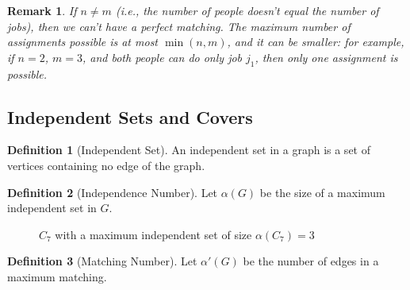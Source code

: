 \documentclass{article}
\newtheorem{remark}{Remark}
\theoremstyle{definition}
\newtheorem{definition}{Definition}
\begin{document}
\begin{remark}
If $n \neq m$ (i.e., the number of people doesn't equal the number of jobs), then we can't have a perfect matching. The maximum number of assignments possible is at most $\min(n, m)$, and it can be smaller: for example, if $n = 2$, $m = 3$, and both people can do only job $j_1$, then only one assignment is possible.
\end{remark}

\subsection{Independent Sets and Covers}

\begin{definition}[Independent Set]
An independent set in a graph is a set of vertices containing no edge of the graph.
\end{definition}

\begin{definition}[Independence Number]
Let $\alpha(G)$ be the size of a maximum independent set in $G$.
\end{definition}

\begin{figure}[h]
\centering
{}
\caption{$C_7$ with a maximum independent set of size $\alpha(C_7) = 3$}
\label{fig:c7-independent-set}
\end{figure}

\begin{definition}[Matching Number]
Let $\alpha'(G)$ be the number of edges in a maximum matching.
\end{definition}
\end{document}
